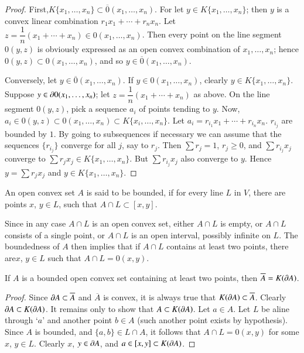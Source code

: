 \begin{proof}
First,\pageoriginale $K\{x_{1},\ldots,x_{n}\}\subset\overline{0}(x_{1},\ldots,x_{n})$. For let $y\in K\{x_{1},\ldots,x_{n}\}$; then $y$ is a convex linear combination $r_{1}x_{1}+\cdots+r_{n}x_{n}$. Let $z=\dfrac{1}{n}(x_{1}+\cdots+x_{n})\in 0(x_{1},\ldots,x_{n})$. Then every point on the line segment $0(y,z)$ is obviously expressed as an open convex combination of $x_{1},\ldots,x_{n}$; hence $0(y,z)\subset 0(x_{1},\ldots,x_{n})$, and so $y\in \overline{0}(x_{1},\ldots,x_{n})$. 

Conversely, let $y\in \overline{0}(x_{1},\ldots,x_{n})$. If $y\in 0(x_{1},\ldots,x_{n})$, clearly $y\in K\{x_{1},\ldots,x_{n}\}$. Suppose $y\in \partial 0(x_{1},\ldots,x_{n})$; let $z=\dfrac{1}{n}(x_{1}+\cdots+x_{n})$ as above. On the line segment $0(y,z)$, pick a sequence $a_{i}$ of points tending to $y$. Now, $a_{i}\in 0(y,z)\subset 0(x_{1},\ldots,x_{n})\subset K\{x_{i},\ldots,x_{n}\}$. Let $a_{i}=r_{i_{1}}x_{1}+\cdots+r_{i_{n}}x_{n}$. $r_{i_{j}}$ are bounded by $1$. By going to subsequences if necessary we can assume that the sequences $\{r_{i_{j}}\}$ converge for all $j$, say to $r_{j}$. Then $\sum r_{j}=1$, $r_{j}\geq 0$, and $\sum r_{i_{j}}x_{j}$ converge to $\sum r_{j}x_{j}\in K\{x_{1},\ldots, x_{n}\}$. But $\sum r_{i_{j}}x_{j}$ also converge to $y$. Hence $y=\sum r_{j}x_{j}$ and $y\in K\{x_{1},\ldots,x_{n}\}$.
\end{proof}

\begin{definition}\label{chap1-defi1.4.17}
An open convex set $A$ is said to be bounded, if for every line $L$ in $V$, there are points $x$, $y\in L$, such that $A\cap L\subset [x,y]$.
\end{definition}

Since in any case $A\cap L$ is an open convex set, either $A\cap L$ is empty, or $A\cap L$ consists of a single point, or $A\cap L$ is an open interval, possibly infinite on $L$. The boundedness of $A$ then implies that if $A\cap L$ contains at least two points, there are\pageoriginale $x$, $y\in L$ such that $A\cap L=0(x,y)$.

\begin{proposition}\label{chap1-prop1.4.18}
If $A$ is a bounded open convex set containing at least two points, then $\overline{A}=K(\partial A)$.
\end{proposition}

\begin{proof}
Since $\partial A\subset \overline{A}$ and $\overline{A}$ is convex, it is always true that $K(\partial A)\subset \overline{A}$. Clearly $\partial A\subset K(\partial A)$. It remains only to show that $A\subset K(\partial A)$. Let $a\in A$. Let $L$ be aline through `$a$' and another point $b\in A$ (such another point exists by hypothesis). Since $A$ is bounded, and $\{a,b\}\in L\cap A$, it follows that $A\cap L=0(x,y)$ for some $x$, $y\in L$. Clearly $x$, $y\in \partial A$, and $a\in [x,y]\subset K(\partial A)$.
\end{proof}

